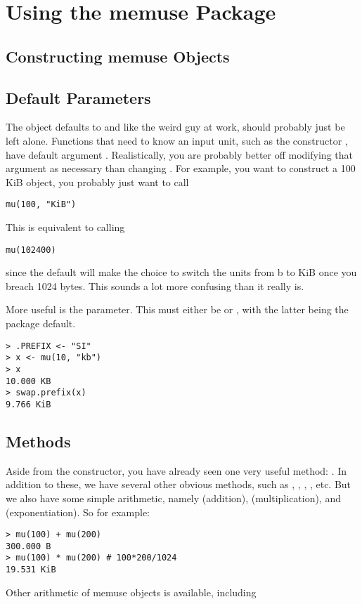 \section{Using the memuse Package}


\subsection{Constructing memuse Objects}




\subsection{Default Parameters}

The  object defaults to  and like the weird guy at work, should probably just be left alone.  Functions that need to know an input unit, such as the constructor , have default argument .  Realistically, you are probably better off modifying that argument as necessary than changing .  For example, you want to construct a 100 KiB  object, you probably just want to call
\begin{lstlisting}[language=rr]
mu(100, "KiB")
\end{lstlisting}
This is equivalent to calling
\begin{lstlisting}[language=rr]
mu(102400)
\end{lstlisting}
since the default  will make the choice to switch the units from b to KiB once you breach 1024 bytes.  This sounds a lot more confusing than it really is.

More useful is the  parameter.  This must either be  or , with the latter being the package default.  
\begin{lstlisting}[language=rr]
> .PREFIX <- "SI"
> x <- mu(10, "kb")
> x
10.000 KB
> swap.prefix(x)
9.766 KiB
\end{lstlisting}



\subsection{Methods}
Aside from the constructor, you have already seen one very useful method:  .  In addition to these, we have several other obvious methods, such as , , , , etc.  But we also have some simple arithmetic, namely  (addition),  (multiplication), and  (exponentiation).  So for example:
\begin{lstlisting}[language=rr]
> mu(100) + mu(200)
300.000 B
> mu(100) * mu(200) # 100*200/1024
19.531 KiB
\end{lstlisting}
Other arithmetic of memuse objects is available, including 

